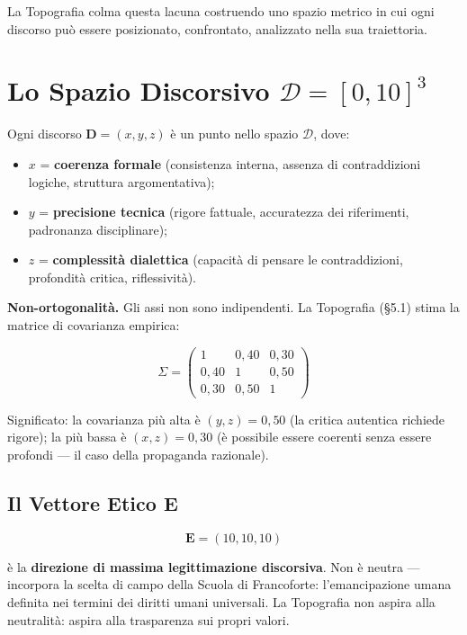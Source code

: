 La Topografia colma questa lacuna costruendo uno spazio metrico in cui
ogni discorso può essere posizionato, confrontato, analizzato nella sua
traiettoria.



\section{\texorpdfstring{Lo Spazio Discorsivo
\(\mathcal{D} = [0, 10]^3\)}{Lo Spazio Discorsivo \textbackslash mathcal\{D\} = {[}0, 10{]}\^{}3}}\label{lo-spazio-discorsivo-mathcald-0-103}

Ogni discorso \(\mathbf{D} = (x, y, z)\) è un punto nello spazio
\(\mathcal{D}\), dove:

\begin{itemize}
\tightlist
\item
  \(x\) = \textbf{coerenza formale} (consistenza interna, assenza di
  contraddizioni logiche, struttura argomentativa);
\item
  \(y\) = \textbf{precisione tecnica} (rigore fattuale, accuratezza dei
  riferimenti, padronanza disciplinare);
\item
  \(z\) = \textbf{complessità dialettica} (capacità di pensare le
  contraddizioni, profondità critica, riflessività).
\end{itemize}

\Hypoth{} \textbf{Non-ortogonalità.} Gli assi non sono indipendenti. La
Topografia (\S{}5.1) stima la matrice di covarianza empirica:

\[
\Sigma = \begin{pmatrix} 1 & 0{,}40 & 0{,}30 \\ 0{,}40 & 1 & 0{,}50 \\ 0{,}30 & 0{,}50 & 1 \end{pmatrix}
\]

\Proved{} Significato: la covarianza più alta è \((y, z) = 0{,}50\) (la
critica autentica richiede rigore); la più bassa è \((x, z) = 0{,}30\)
(è possibile essere coerenti senza essere profondi --- il caso della
propaganda razionale).

\subsection{\texorpdfstring{Il Vettore Etico
\(\mathbf{E}\)}{Il Vettore Etico \textbackslash mathbf\{E\}}}\label{il-vettore-etico-mathbfe}

\[
\mathbf{E} = (10, 10, 10)
\]

è la \textbf{direzione di massima legittimazione discorsiva}. Non è
neutra --- incorpora la scelta di campo della Scuola di Francoforte:
l'emancipazione umana definita nei termini dei diritti umani universali.
La Topografia non aspira alla neutralità: aspira alla trasparenza sui
propri valori.



